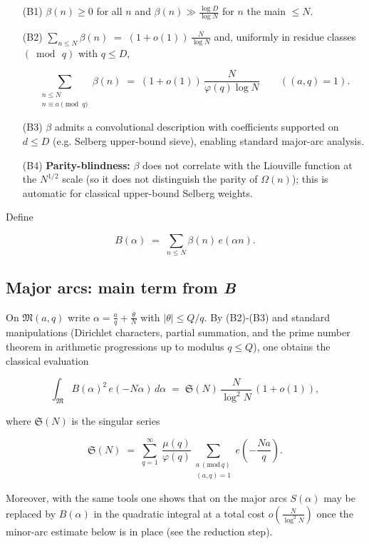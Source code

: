 \documentclass[11pt]{article}
\theoremstyle{definition}
\theoremstyle{remark}
\numberwithin{equation}{part}
\begin{document}
\begin{itemize}[leftmargin=*]
	\item[(B1)] $\beta(n)\ge 0$ for all $n$ and $\beta(n)\gg \tfrac{\log D}{\log N}$ for $n$ the main $\le N$.
	\item[(B2)] $\displaystyle \sum_{n\le N}\beta(n)\;=\;(1+o(1))\,\frac{N}{\log N}$ and, uniformly in residue classes $(\bmod\,q)$ with $q\le D$,

	      $$
		      \sum_{\substack{n\le N\\ n\equiv a\!\!\!\pmod q}}\beta(n)
		      \;=\;(1+o(1))\,\frac{N}{\varphi(q)\log N}\qquad ((a,q)=1).
	      $$

	\item[(B3)] $\beta$ admits a convolutional description with coefficients supported on $d\le D$ (e.g. Selberg upper-bound sieve), enabling standard major-arc analysis.
	\item[(B4)] \textbf{Parity-blindness:} $\beta$ does not correlate with the Liouville function at the $N^{1/2}$ scale (so it does not distinguish the parity of $\Omega(n)$); this is automatic for classical upper-bound Selberg weights.
\end{itemize}

Define

$$
	B(\alpha)\;=\;\sum_{n\le N}\beta(n)\,e(\alpha n).
$$


\subsection*{Major arcs: main term from \textit{B}}

On $\mathfrak M(a,q)$ write $\alpha=\tfrac{a}{q}+\tfrac{\theta}{N}$ with
$|\theta|\le Q/q$. By (B2)-(B3) and standard manipulations (Dirichlet characters, partial summation, and the prime number theorem in arithmetic progressions up to modulus $q\le Q$), one obtains the classical evaluation

$$
	\int_{\mathfrak M} B(\alpha)^2\,e(-N\alpha)\,d\alpha
	\;=\;\mathfrak S(N)\,\frac{N}{\log^2 N}\,(1+o(1)),
$$

where $\mathfrak S(N)$ is the singular series

$$
	\mathfrak S(N)\;=\;\sum_{q=1}^{\infty}\ \frac{\mu(q)}{\varphi(q)}\!
	\sum_{\substack{a\,(\mathrm{mod}\,q)\\(a,q)=1}} e\!\left(-\frac{Na}{q}\right).
$$

Moreover, with the same tools one shows that on the major arcs $S(\alpha)$ may be replaced by $B(\alpha)$ in the quadratic integral at a total cost $o\!\left(\tfrac{N}{\log^2 N}\right)$ once the minor-arc estimate below is in place (see the reduction step).
\end{document}
